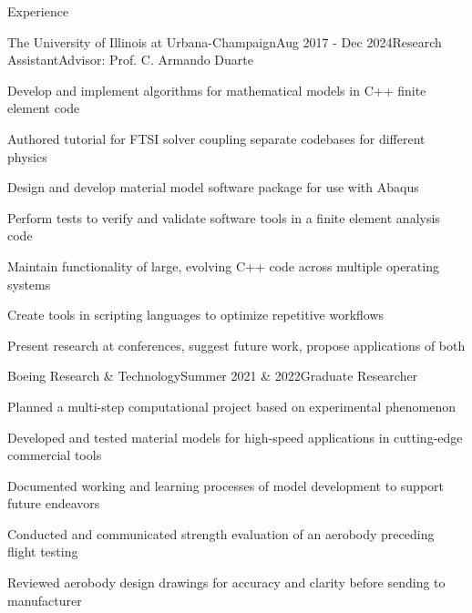 \documentclass{resume} %
\begin{document}
\begin{rSection}{Experience}

\begin{rSubsection}{The University of Illinois at Urbana-Champaign}{Aug 2017 - Dec 2024}{Research Assistant}{Advisor: Prof. C. Armando Duarte}
\item Develop and implement algorithms for mathematical models in C++ finite element code 
\item Authored tutorial for FTSI solver coupling separate codebases for different physics
\item Design and develop material model software package for use with Abaqus
\item Perform tests to verify and validate software tools in a finite element analysis code
\item Maintain functionality of large, evolving C++ code across multiple operating systems
\item Create tools in scripting languages to optimize repetitive workflows
\item Present research at conferences, suggest future work, propose applications of both
\end{rSubsection}


\begin{rSubsection}{Boeing Research \& Technology}{Summer 2021  \& 2022}{Graduate Researcher}{}
%
\item Planned a multi-step computational project based on experimental phenomenon
\item Developed and tested material models for high-speed applications in cutting-edge commercial tools
\item Documented working and learning processes of model development to support future endeavors
\item Conducted and communicated strength evaluation of an aerobody preceding flight testing
\item Reviewed aerobody design drawings for accuracy and clarity before sending to manufacturer
\end{rSubsection}

\end{rSection}

\end{document}
